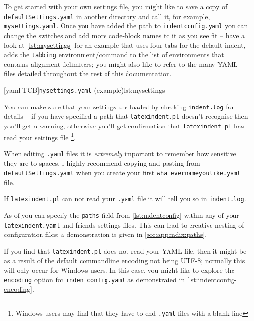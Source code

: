  To get started with your own settings file, you might like to save a copy of
 \texttt{defaultSettings.yaml} in another directory and call it, for example,
 \texttt{mysettings.yaml}. Once you have added the path to \texttt{indentconfig.yaml} you
 can change the switches and add more code-block names to it as you see fit -- have a
 look at \cref{lst:mysettings} for an example that uses four tabs for the default indent,
 adds the \texttt{tabbing} environment/command to the list of environments that contains
 alignment delimiters; you might also like to refer to the many YAML files detailed
 throughout the rest of this documentation. 

 [yaml-TCB]{\texttt{mysettings.yaml} (example)}{lst:mysettings}

 You can make sure that your settings are loaded by checking \texttt{indent.log} for
 details -- if you have specified a path that \texttt{latexindent.pl} doesn't recognise
 then you'll get a warning, otherwise you'll get confirmation that
 \texttt{latexindent.pl} has read your settings file \footnote{Windows users may find
 that they have to end \texttt{.yaml} files with a blank line}. 

 \begin{warning}
  When editing \texttt{.yaml} files it is \emph{extremely} important to remember how
  sensitive they are to spaces. I highly recommend copying and pasting from
  \texttt{defaultSettings.yaml} when you create your first
  \texttt{whatevernameyoulike.yaml} file.

  If \texttt{latexindent.pl} can not read your \texttt{.yaml} file it will tell you so in
  \texttt{indent.log}.
 \end{warning}

 As of  you can specify the
 \texttt{paths} field from \cref{lst:indentconfig} within any of your
 \texttt{latexindent.yaml} and friends settings files. This can lead to creative nesting
 of configuration files; a demonstration is given in \vref{sec:appendix:paths}.

 If you find that 
 \texttt{latexindent.pl} does not read your YAML file, then it might be as a result of
 the default commandline encoding not being UTF-8; normally this will only occur for
 Windows users. In this case, you might like to explore the \texttt{encoding} option for
 \texttt{indentconfig.yaml} as demonstrated in \cref{lst:indentconfig-encoding}.%

